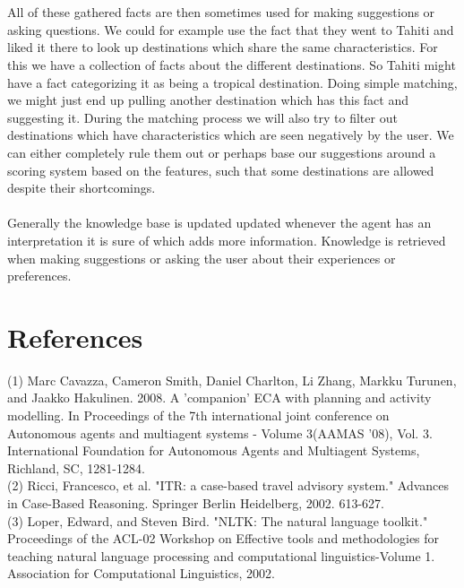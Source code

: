 \documentclass[11pt]{article} %
\begin{document}
\\
\\
All of these gathered facts are then sometimes used for making suggestions or asking questions. We could for example use the fact that they went to Tahiti and liked it there to look up destinations which share the same characteristics. For this we have a collection of facts about the different destinations. So Tahiti might have a fact categorizing it as being a tropical destination. Doing simple matching, we might just end up pulling another destination which has this fact and suggesting it. During the matching process we will also try to filter out destinations which have characteristics which are seen negatively by the user. We can either completely rule them out or perhaps base our suggestions around a scoring system based on the features, such that some destinations are allowed despite their shortcomings.
\\
\\
Generally the knowledge base is updated updated whenever the agent has an interpretation it is sure of which adds more information. Knowledge is retrieved when making suggestions or asking the user about their experiences or preferences.
\section{References}
(1) Marc Cavazza, Cameron Smith, Daniel Charlton, Li Zhang, Markku Turunen, and Jaakko Hakulinen. 2008. A 'companion' ECA with planning and activity modelling. In Proceedings of the 7th international joint conference on Autonomous agents and multiagent systems - Volume 3(AAMAS '08), Vol. 3. International Foundation for Autonomous Agents and Multiagent Systems, Richland, SC, 1281-1284.\\
(2) Ricci, Francesco, et al. "ITR: a case-based travel advisory system." Advances in Case-Based Reasoning. Springer Berlin Heidelberg, 2002. 613-627.\\
(3) Loper, Edward, and Steven Bird. "NLTK: The natural language toolkit." Proceedings of the ACL-02 Workshop on Effective tools and methodologies for teaching natural language processing and computational linguistics-Volume 1. Association for Computational Linguistics, 2002.
\end{document}
